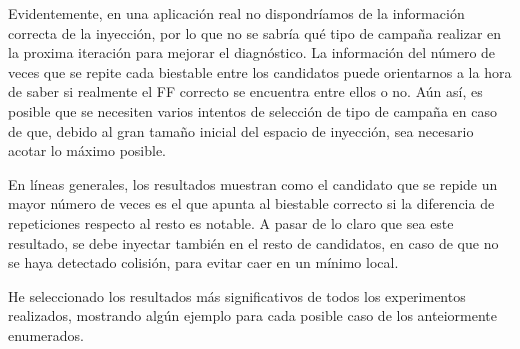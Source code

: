 Evidentemente, en una aplicación real no dispondríamos de la información correcta
de la inyección, por lo que no se sabría qué tipo de campaña realizar en la
proxima iteración para mejorar el diagnóstico. La información del número de veces
que se repite cada biestable entre los candidatos puede orientarnos a la hora de
saber si realmente el \gls{FF} correcto se encuentra entre ellos o no. Aún
así, es posible que se necesiten varios intentos de selección de tipo de campaña
en caso de que, debido al gran tamaño inicial del espacio de inyección, sea
necesario acotar lo máximo posible.

En líneas generales, los resultados muestran como el candidato que se repide un
mayor número de veces es el que apunta al biestable correcto si la diferencia
de repeticiones respecto al resto es notable. A pasar de lo claro
que sea este resultado, se debe inyectar también en el resto de candidatos, en caso
de que no se haya detectado colisión, para evitar caer en un mínimo local.

He seleccionado los resultados más significativos de todos los experimentos
realizados, mostrando algún ejemplo para cada posible caso de los anteiormente
enumerados.






\endinput
